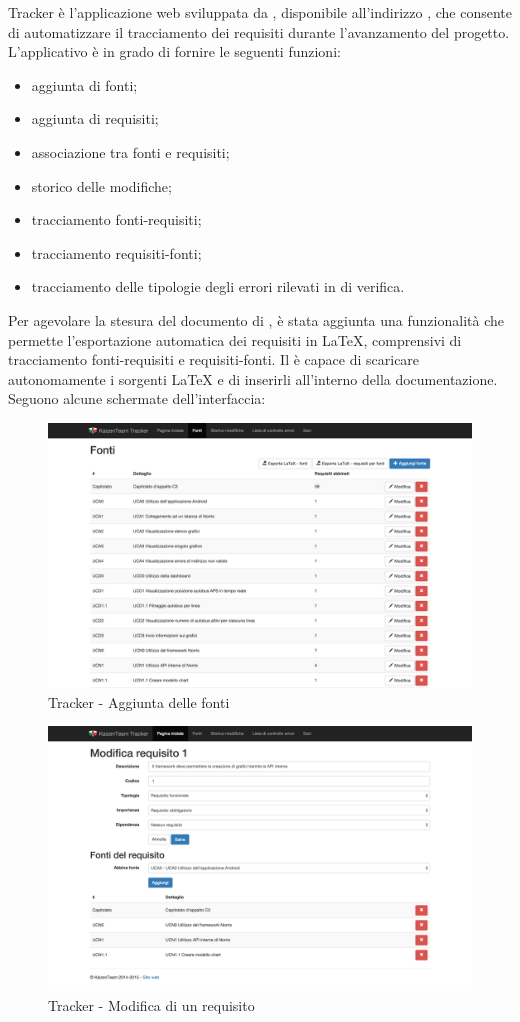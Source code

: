  \label{sec:tracker}

Tracker è l'applicazione web sviluppata da \groupname{}, disponibile all'indirizzo , che consente di automatizzare il tracciamento dei requisiti durante l’avanzamento del progetto. \\
L'applicativo è in grado di fornire le seguenti funzioni:
\begin{itemize}
	\item aggiunta di fonti;
	\item aggiunta di requisiti;
	\item associazione tra fonti e requisiti;
	\item storico delle modifiche;
	\item tracciamento fonti-requisiti;
	\item tracciamento requisiti-fonti;
	\item tracciamento delle tipologie degli errori rilevati in  di verifica.
\end{itemize}

Per agevolare la stesura del documento di , è stata aggiunta una funzionalità che permette l’esportazione automatica dei requisiti in \LaTeX, comprensivi di tracciamento fonti-requisiti e requisiti-fonti. Il  è capace di scaricare autonomamente i sorgenti \LaTeX{} e di inserirli all’interno della documentazione. \\
Seguono alcune schermate dell’interfaccia:

\begin{figure}[H]
	\centering
	\includegraphics[width=\textwidth]{Pics/TrackerFonti}
	\caption{Tracker - Aggiunta delle fonti}
\end{figure}


\begin{figure}[H]
	\centering
	\includegraphics[width=\textwidth]{Pics/TrackerModificaRequisito}
	\caption{Tracker - Modifica di un requisito}
\end{figure}
